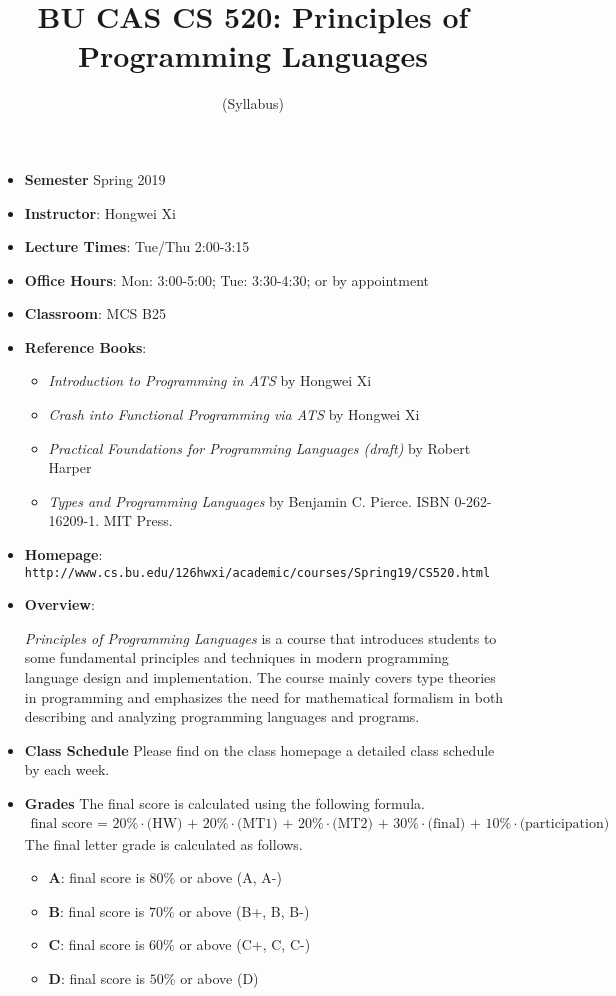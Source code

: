 \documentclass[11pt]{article}
\title{BU CAS CS 520: Principles of Programming Languages}
\author{(Syllabus)}
\date{}
\begin{document}
\maketitle
\thispagestyle{empty}

\begin{itemize}
\item {\bf Semester} Spring 2019
\item {\bf Instructor}: Hongwei Xi
\item {\bf Lecture Times}: Tue/Thu 2:00-3:15
\item {\bf Office Hours}: Mon: 3:00-5:00; Tue: 3:30-4:30; or by appointment
\item {\bf Classroom}: MCS B25

\item {\bf Reference Books}:\kern6pt
\begin{itemize}
\item
{\em Introduction to Programming in ATS} by Hongwei Xi
\item
{\em Crash into Functional Programming via ATS} by Hongwei Xi
\item
{\em Practical Foundations for Programming Languages (draft)} by Robert Harper
\item
{\em Types and Programming Languages} by Benjamin C. Pierce.  ISBN 0-262-16209-1. MIT Press.
\end{itemize}

\item {\bf Homepage}: {\tt http://www.cs.bu.edu/\char126hwxi/academic/courses/Spring19/CS520.html}

\item {\bf Overview}:

{\em Principles of Programming Languages} is a course
that introduces students to some fundamental principles and techniques in
modern programming language design and implementation. The course mainly
covers type theories in programming and emphasizes the need for
mathematical formalism in both describing and analyzing programming
languages and programs.

\item {\bf Class Schedule}
Please find on the class homepage a detailed class schedule by each week.

\item {\bf Grades}
The final score is calculated using the following formula.
\[\begin{array}{l}
\mbox{final score = 20\%$\cdot$(HW) + 20\%$\cdot$(MT1) + 20\%$\cdot$(MT2) + 30\%$\cdot$(final) + 10\%$\cdot$(participation)}
\end{array}\]
The final letter grade is calculated as follows.
\begin{itemize}
\item{\bf A}: final score is $80\%$ or above (A, A-)
\item{\bf B}: final score is $70\%$ or above (B+, B, B-)
\item{\bf C}: final score is $60\%$ or above (C+, C, C-)
\item{\bf D}: final score is $50\%$ or above (D)
\end{itemize}


\end{itemize}
\end{document}
